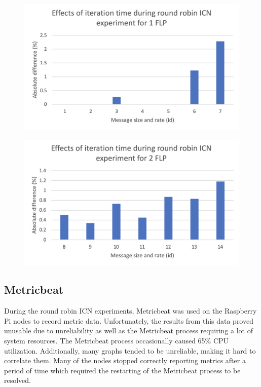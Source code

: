 \documentclass[]{article}
\begin{document}
\begin{center}
	\begin{figure}[H]
		\includegraphics[width=\textwidth]{"images/Effects of iteration time during round robin ICN experiment for 1 FLP"}
	\end{figure}
\end{center}

\begin{center}
	\begin{figure}[H]
		\includegraphics[width=\textwidth]{"images/Effects of iteration time during round robin ICN experiment for 2 FLP"}
	\end{figure}
\end{center}

\subsection{Metricbeat}
During the round robin ICN experiments, Metricbeat was used on the Raspberry Pi nodes to record metric data. Unfortunately, the results from this data proved unusable due to unreliability as well as the Metricbeat process requiring a lot of system resources. The Metricbeat process occasionally caused 65\% CPU utilization. Additionally, many graphs tended to be unreliable, making it hard to correlate them. Many of the nodes stopped correctly reporting metrics after a period of time which required the restarting of the Metricbeat process to be resolved.
\end{document}

